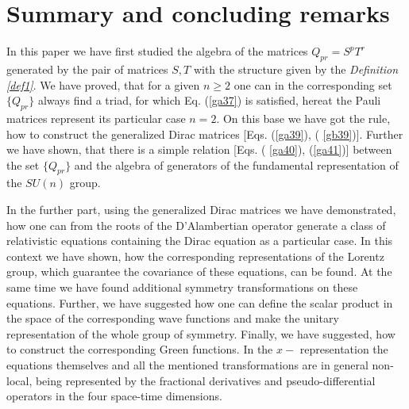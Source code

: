\documentclass[a4paper,a4paper]{article}
\begin{document}
\section{Summary and concluding remarks}

In this paper we have first studied the algebra of the matrices $%
Q_{pr}=S^{p}T^{r}$ generated by the pair of matrices $S,T$ with the
structure given by the \textit{Definition \ref{def1}}. We have proved, that
for a given $n\geq 2$ one can in the corresponding set $\{Q_{pr}\}$ always
find a triad, for which Eq. (\ref{ga37}) is satisfied, hereat the Pauli
matrices represent its particular case $n=2$. On this base we have got the
rule, how to construct the generalized Dirac matrices [Eqs. (\ref{ga39}), (%
\ref{gb39})]. Further we have shown, that there is a simple relation [Eqs. (%
\ref{ga40}), (\ref{ga41})] between the set $\{Q_{pr}\}$ and the algebra of
generators of the fundamental representation of the $SU(n)$ group.

In the further part, using the generalized Dirac matrices we have
demonstrated, how one can from the roots of the D'Alambertian operator
generate a class of relativistic equations containing the Dirac equation as
a particular case. In this context we have shown, how the corresponding
representations of the Lorentz group, which guarantee the covariance of
these equations, can be found. At the same time we have found additional
symmetry transformations on these equations. Further, we have suggested how
one can define the scalar product in the space of the corresponding wave
functions and make the unitary representation of the whole group of
symmetry. Finally, we have suggested, how to construct the corresponding
Green functions. In the $x-$ representation the equations themselves and all
the mentioned transformations are in general non-local, being represented by
the fractional derivatives and pseudo-differential operators in the four
space-time dimensions.
\end{document}
